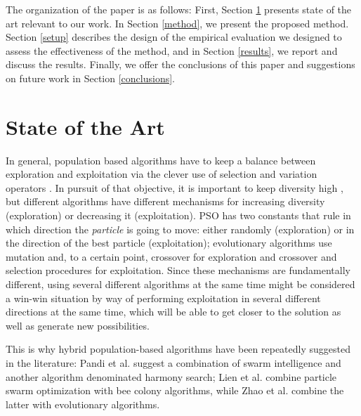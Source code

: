 The organization of the paper is as follows: First, Section \ref{soa} presents
state of the art relevant to our work. In Section \ref{method}, we present the
proposed method.  Section \ref{setup} describes the design of the empirical
evaluation we designed to assess the effectiveness of the method, and in Section
\ref{results}, we report and discuss the results. Finally, we offer the
conclusions of this paper and suggestions on future work in Section
\ref{conclusions}.


\section{State of the Art}
\label{soa}

In general, population based algorithms have to keep a balance between
exploration and exploitation via the clever use of selection and
variation operators \cite{vcrepinvsek2013exploration}. In pursuit of
that objective, it is important to keep diversity high
\cite{yuan2005importance}, but different algorithms have different
mechanisms for increasing diversity (exploration) or decreasing it
(exploitation). PSO has two constants that rule in which direction the
{\em particle} is going to move: either randomly (exploration) or in
the direction of the best particle (exploitation); evolutionary
algorithms use mutation and, to a certain point, crossover for
exploration and crossover and selection procedures for
exploitation. Since these mechanisms are fundamentally different,
using several different algorithms at the same time might be
considered a win-win situation by way of performing exploitation in
several different directions at the same time, which will be able to
get closer to the solution as well as generate new possibilities.

This
is why hybrid population-based algorithms have been repeatedly
suggested in the literature: Pandi et al. \cite{pandi2011dynamic}
suggest a combination of swarm intelligence and another algorithm
denominated harmony search; Lien et al. \cite{lien2012hybrid} combine
particle swarm optimization with bee colony algorithms, while Zhao et
al. \cite{zhao2010hybrid} combine the latter with evolutionary
algorithms.

